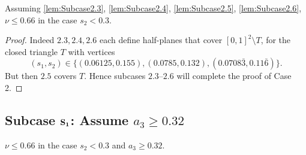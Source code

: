 \begin{lemma}\label{lem:Case2}
  \leanok
  Assuming \ref{lem:Subcase2.3}, \ref{lem:Subcase2.4}, \ref{lem:Subcase2.5}, \ref{lem:Subcase2.6},
  $\nu \leq 0.66$ in the case $s_2 < 0.3$.
\end{lemma}
\begin{proof}
  \leanok
  Indeed $\mathbf{2.3}, \mathbf{2.4}, \mathbf{2.6}$
  each define half-planes that cover $[0,1]^2\setminus T$, for the closed triangle $T$ with vertices
  \[
  (s_1,s_2)\in \{(0.06125,0.155), (0.0785,0.132), (
  0.0708\bar3,
  0.11\bar 6)\}.
  \]
  But then
  $\mathbf{2.5}$ covers $T$. Hence subcases $\mathbf{2.3}$--$\mathbf{2.6}$ will complete the proof of Case 2.
\end{proof}

\subsection*{Subcase $\bf{S_1}$: Assume $a_3\geq 0.32$}

\begin{lemma}\label{lem:Subcase2.1}
  \leanok
  $\nu \leq 0.66$ in the case $s_2<0.3$ and $a_3\geq 0.32$.
\end{lemma}

